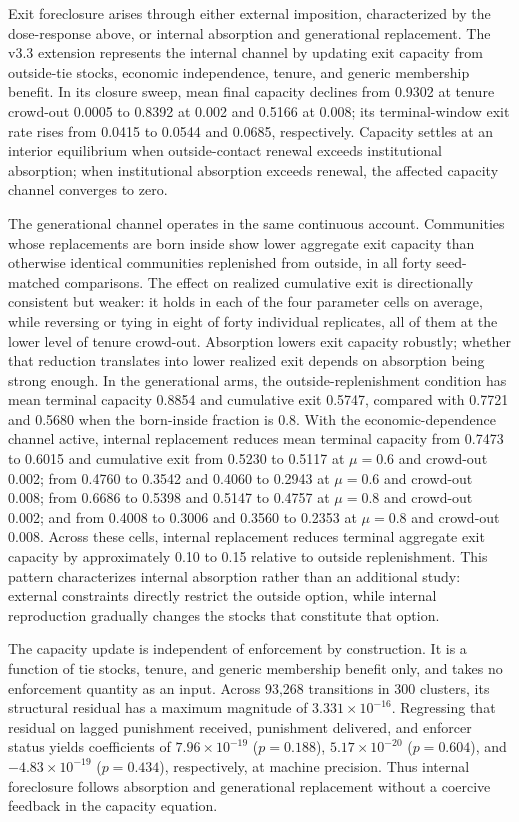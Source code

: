 \documentclass[12pt]{article}
\begin{document}
Exit foreclosure arises through either external imposition, characterized by the dose-response above, or internal absorption and generational replacement. The v3.3 extension represents the internal channel by updating exit capacity from outside-tie stocks, economic independence, tenure, and generic membership benefit. In its closure sweep, mean final capacity declines from 0.9302 at tenure crowd-out 0.0005 to 0.8392 at 0.002 and 0.5166 at 0.008; its terminal-window exit rate rises from 0.0415 to 0.0544 and 0.0685, respectively. Capacity settles at an interior equilibrium when outside-contact renewal exceeds institutional absorption; when institutional absorption exceeds renewal, the affected capacity channel converges to zero.

The generational channel operates in the same continuous account. Communities whose replacements are born inside show lower aggregate exit capacity than otherwise identical communities replenished from outside, in all forty seed-matched comparisons. The effect on realized cumulative exit is directionally consistent but weaker: it holds in each of the four parameter cells on average, while reversing or tying in eight of forty individual replicates, all of them at the lower level of tenure crowd-out. Absorption lowers exit capacity robustly; whether that reduction translates into lower realized exit depends on absorption being strong enough. In the generational arms, the outside-replenishment condition has mean terminal capacity 0.8854 and cumulative exit 0.5747, compared with 0.7721 and 0.5680 when the born-inside fraction is 0.8. With the economic-dependence channel active, internal replacement reduces mean terminal capacity from 0.7473 to 0.6015 and cumulative exit from 0.5230 to 0.5117 at $\mu=0.6$ and crowd-out 0.002; from 0.4760 to 0.3542 and 0.4060 to 0.2943 at $\mu=0.6$ and crowd-out 0.008; from 0.6686 to 0.5398 and 0.5147 to 0.4757 at $\mu=0.8$ and crowd-out 0.002; and from 0.4008 to 0.3006 and 0.3560 to 0.2353 at $\mu=0.8$ and crowd-out 0.008. Across these cells, internal replacement reduces terminal aggregate exit capacity by approximately 0.10 to 0.15 relative to outside replenishment. This pattern characterizes internal absorption rather than an additional study: external constraints directly restrict the outside option, while internal reproduction gradually changes the stocks that constitute that option.

The capacity update is independent of enforcement by construction. It is a function of tie stocks, tenure, and generic membership benefit only, and takes no enforcement quantity as an input. Across 93,268 transitions in 300 clusters, its structural residual has a maximum magnitude of $3.331\times10^{-16}$. Regressing that residual on lagged punishment received, punishment delivered, and enforcer status yields coefficients of $7.96\times10^{-19}$ ($p=0.188$), $5.17\times10^{-20}$ ($p=0.604$), and $-4.83\times10^{-19}$ ($p=0.434$), respectively, at machine precision. Thus internal foreclosure follows absorption and generational replacement without a coercive feedback in the capacity equation.
\end{document}
